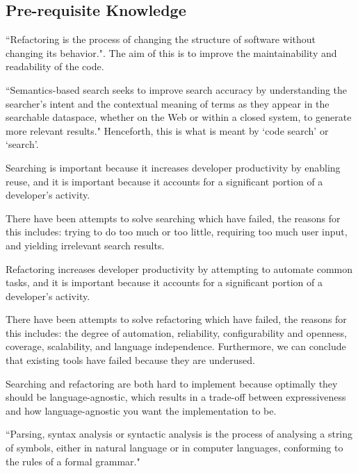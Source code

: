 \documentclass[12pt, letterpaper]{article}
\begin{document}
\subsection{Pre-requisite Knowledge}
``Refactoring is the process of changing the structure of software without changing its behavior.". \autocite{murphy2012we} The aim of this is to improve the maintainability and readability of the code.

``Semantics-based search seeks to improve search accuracy by understanding the searcher's intent and the contextual meaning of terms as they appear in the searchable dataspace, whether on the Web or within a closed system, to generate more relevant results." \autocite{wikipediasemanticsearch} Henceforth, this is what is meant by `code search' or `search'.

Searching is important because it increases developer productivity by enabling reuse, and it is important because it accounts for a significant portion of a developer's activity. \autocite{reiss2009semantics,stolee2014solving}

There have been attempts to solve searching which have failed, the reasons for this includes: trying to do too much or too little, requiring too much user input, and yielding irrelevant search results. \autocite{reiss2009semantics,stolee2014solving}

Refactoring increases developer productivity by attempting to automate common tasks, and it is important because it accounts for a significant portion of a developer's activity. \autocite{mens2004survey,murphy2012we}

There have been attempts to solve refactoring which have failed, the reasons for this includes: the degree of automation, reliability, configurability and openness, coverage, scalability, and language independence. \autocite{mens2004survey} Furthermore, we can conclude that existing tools have failed because they are underused. \autocite{murphy2012we}

Searching and refactoring are both hard to implement because optimally they should be language-agnostic\autocite{mens2004survey,reiss2009semantics}, which results in a trade-off between expressiveness and how language-agnostic you want the implementation to be.

``Parsing, syntax analysis or syntactic analysis is the process of analysing a string of symbols, either in natural language or in computer languages, conforming to the rules of a formal grammar." \autocite{wikipediaparsing}
\end{document}

